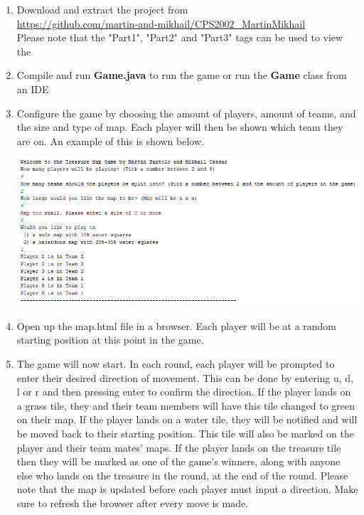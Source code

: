 \documentclass[a4paper,12pt]{extarticle}
\begin{document}
\begin{enumerate}
	\item Download and extract the project from\\
	\url{https://github.com/martin-and-mikhail/CPS2002_MartinMikhail}\\
	Please note that the "Part1", "Part2" and "Part3" tags can be used to view the 
	
	\item Compile and run \textbf{Game.java} to run the game or run the \textbf{Game} class from an IDE
	
	\item Configure the game by choosing the amount of players, amount of teams, and the size and type 		 	of map. Each player will then be shown which team they are on. An example of this is shown below.
	
	\begin{center}
	\includegraphics[scale=0.65]{Figure6.png}\\
	\end{center}
	
	\item Open up the map.html file in a browser. Each player will be at a random starting position at 			this point in the game.
	
	\item The game will now start. In each round, each player will be prompted to enter their desired 			direction of movement. This can be done by entering u, d, l or r and then pressing enter to confirm 		the direction. If the player lands on a grass tile, they and their team members will have this tile 		changed to green on their map. If the player lands on a water tile, they will be notified and will 			be moved back to their starting position. This tile will also be marked on the player and their team 	mates' maps. If the player lands on the treasure tile then they will be marked as one of the game's 		winners, along with anyone else who lands on the treasure in the round, at the end of the round. 			Please note that the map is updated before each player must input a direction. Make sure to refresh 		the browser after every move is made.
\end{enumerate}
\end{document}
